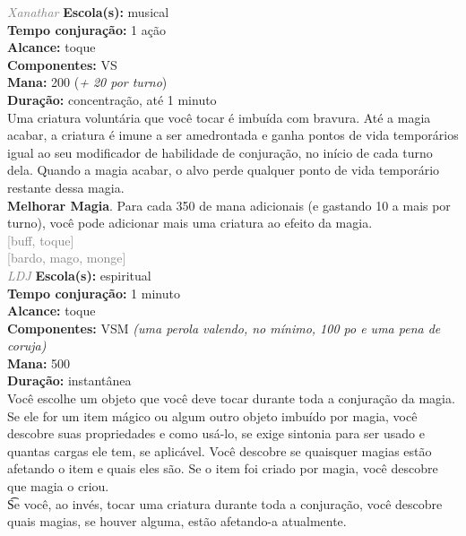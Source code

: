 \documentclass{RPG_Adventure}[2021/10/20]
\begin{document}
{\tiny \textcolor{gray}{\textit{Xanathar}}}
{\small \t \textbf{Escola(s):} musical\\\t \textbf{Tempo conjuração:} 1 ação\\\t \textbf{Alcance:} toque\\\t \textbf{Componentes:} VS\\\t \textbf{Mana:} 200 (\textit{+ 20 por turno})\\\t \textbf{Duração:} concentração, até 1 minuto\\}
{\normalsize Uma criatura voluntária que você tocar é imbuída com bravura. Até a magia acabar, a criatura é imune a ser amedrontada e ganha pontos de vida temporários igual ao seu modificador de habilidade de conjuração, no início de cada turno dela. Quando a magia acabar, o alvo perde qualquer ponto de vida temporário restante dessa magia.\\\t \textbf{Melhorar Magia}. Para cada 350 de mana adicionais (e gastando 10 a mais por turno), você pode adicionar mais uma criatura ao efeito da magia.\\}
{\scriptsize \textcolor{gray}{[buff, toque]\\}}
{\scriptsize \textcolor{gray}{[bardo, mago, monge]\\}}
{\tiny \textcolor{gray}{\textit{LDJ}}}
{\small \t \textbf{Escola(s):} espiritual\\\t \textbf{Tempo conjuração:} 1 minuto\\\t \textbf{Alcance:} toque\\\t \textbf{Componentes:} VSM \textit{(uma perola valendo, no mínimo, 100 po e uma pena de coruja)}\\\t \textbf{Mana:} 500\\\t \textbf{Duração:} instantânea\\}
{\normalsize Você escolhe um objeto que você deve tocar durante toda a conjuração da magia. Se ele for um item mágico ou algum outro objeto imbuído por magia, você descobre suas propriedades e como usá-lo, se exige sintonia para ser usado e quantas cargas ele tem, se aplicável. Você descobre se quaisquer magias estão afetando o item e quais eles são. Se o item foi criado por magia, você descobre que magia o criou.  \\\t Se você, ao invés, tocar uma criatura durante toda a conjuração, você descobre quais magias, se houver alguma, estão afetando-a atualmente.\\}
\end{document}
